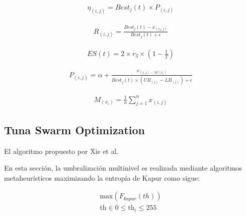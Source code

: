 \documentclass[conference]{IEEEtran}
\begin{document}
\begin{equation}
	\begin{gathered}
		\eta_{(i,j)}=Best_j(t)\times P_{(i,j)}
	\end{gathered}
	\label{eq35}
\end{equation}

\begin{equation}
	\begin{gathered}
		R_{(i,j)}=\frac{Best_j(t) - x_{(r_2,j)}}{Best_j(t) +\epsilon}
	\end{gathered}
	\label{eq36}
\end{equation}

\begin{equation}
	\begin{gathered}
		ES(t)=2 \times r_3 \times (1 - \frac{1}{T})
	\end{gathered}
	\label{eq37}
\end{equation}

\begin{equation}
	\begin{gathered}
		P_{(i,j)}=\alpha + \frac{x_{(i,j) - M(x_i)}}{Best_j(t) \times (UB_{(j)}-LB_{(j)})+\epsilon} 
	\end{gathered}
	\label{eq38}
\end{equation}

\begin{equation}
	\begin{gathered}
		M_{(x_i)} = \frac{1}{n} \sum_{j=1}^{n} x_{(i,j)}
	\end{gathered}
	\label{eq39}
\end{equation}

\subsection{Tuna Swarm Optimization}

\noindent El algoritmo propuesto por Xie et al.~\cite{Xie2021}


\noindent En esta sección, la umbralización multinivel es realizada mediante algoritmos metaheurísticos maximizando la entropía de Kapur como sigue:

\begin{equation}
	\begin{gathered}
		\text{max}(F_{kapur}(th)) \\
		\text{th} \in 0 \leq \text{th}_i \leq 255
	\end{gathered}
	\label{eq10}
\end{equation}
\end{document}
